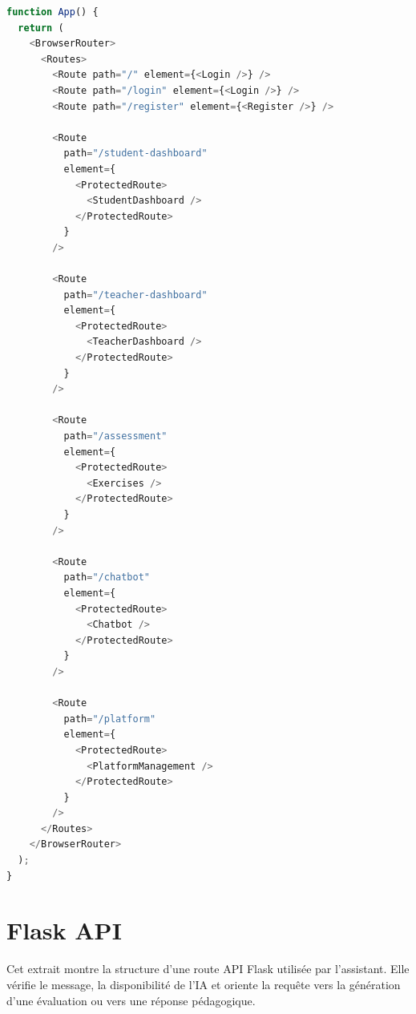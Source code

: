 \documentclass[12pt,a4paper]{report}
\begin{document}
\begin{lstlisting}[style=learnixcode,language=JavaScript,caption={Configuration des routes React},label={lst:react-routing}]
function App() {
  return (
    <BrowserRouter>
      <Routes>
        <Route path="/" element={<Login />} />
        <Route path="/login" element={<Login />} />
        <Route path="/register" element={<Register />} />

        <Route
          path="/student-dashboard"
          element={
            <ProtectedRoute>
              <StudentDashboard />
            </ProtectedRoute>
          }
        />

        <Route
          path="/teacher-dashboard"
          element={
            <ProtectedRoute>
              <TeacherDashboard />
            </ProtectedRoute>
          }
        />

        <Route
          path="/assessment"
          element={
            <ProtectedRoute>
              <Exercises />
            </ProtectedRoute>
          }
        />

        <Route
          path="/chatbot"
          element={
            <ProtectedRoute>
              <Chatbot />
            </ProtectedRoute>
          }
        />

        <Route
          path="/platform"
          element={
            <ProtectedRoute>
              <PlatformManagement />
            </ProtectedRoute>
          }
        />
      </Routes>
    </BrowserRouter>
  );
}
\end{lstlisting}

\section{Flask API}
Cet extrait montre la structure d'une route API Flask utilisée par l'assistant.
Elle vérifie le message, la disponibilité de l'IA et oriente la requête vers la
génération d'une évaluation ou vers une réponse pédagogique.
\end{document}
